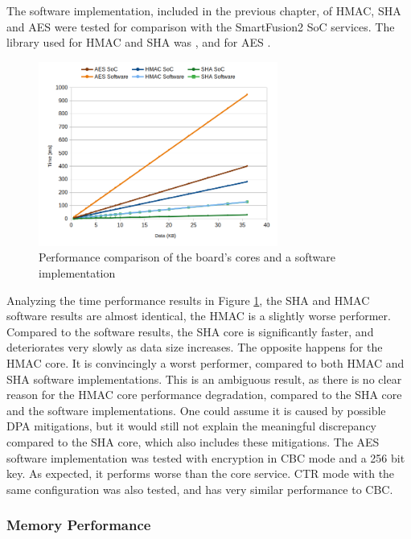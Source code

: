 The software implementation, included in the previous chapter, of HMAC, SHA and AES were tested for comparison with the SmartFusion2 SoC services. The library used for HMAC and SHA was \cite{ogayHMAC}, and for AES \cite{tinycrypt}. 

\begin{figure}[h!]
	\centering
	\includegraphics[width=0.7\textwidth]{./Images/software-core-time.png}
	\caption{Performance comparison of the board's cores and a software implementation}
	\label{fig:performance:software-core-time}
\end{figure}

Analyzing the time performance results in Figure \ref{fig:performance:software-core-time}, the SHA and HMAC software results are almost identical, the HMAC is a slightly worse performer. Compared to the software results, the SHA core is significantly faster, and deteriorates very slowly as data size increases. The opposite happens for the HMAC core. It is convincingly a worst performer, compared to both HMAC and SHA software implementations. 
This is an ambiguous result, as there is no clear reason for the HMAC core performance degradation, compared to the SHA core and the software implementations. One could assume it is caused by possible DPA mitigations, but it would still not explain the meaningful discrepancy compared to the SHA core, which also includes these mitigations.
The AES software implementation was tested with encryption in CBC mode and a 256 bit key. As expected, it performs worse than the core service. CTR mode with the same configuration was also tested, and has very similar performance to CBC.

\subsubsection*{Memory Performance}\label{chap:evaluation:services:memory}

